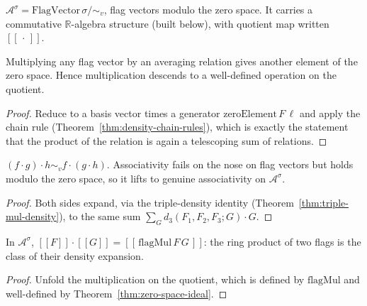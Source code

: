 \begin{definition}
  \label{def:flag-algebra}
  \leanok
  $\mathcal{A}^\sigma = \mathrm{FlagVector}\,\sigma / {\sim_v}$, flag vectors
  modulo the zero space. It carries a commutative $\mathbb{R}$-algebra structure
  (built below), with quotient map written $[\![\,\cdot\,]\!]$.
\end{definition}

\begin{theorem}
  \label{thm:zero-space-ideal}
  \leanok
  Multiplying any flag vector by an averaging relation gives another element of
  the zero space. Hence multiplication descends to a well-defined operation on
  the quotient.
\end{theorem}
\begin{proof}\leanok
  Reduce to a basis vector times a generator $\mathrm{zeroElement}\,F\,\ell$ and
  apply the chain rule (Theorem~\ref{thm:density-chain-rules}), which is exactly
  the statement that the product of the relation is again a telescoping sum of
  relations.
\end{proof}

\begin{theorem}
  \label{thm:mul-assoc}
  \leanok
  $(f\cdot g)\cdot h \sim_v f\cdot(g\cdot h)$. Associativity fails on the nose on
  flag vectors but holds modulo the zero space, so it lifts to genuine
  associativity on $\mathcal{A}^\sigma$.
\end{theorem}
\begin{proof}\leanok
  Both sides expand, via the triple-density identity
  (Theorem~\ref{thm:triple-mul-density}), to the same sum
  $\sum_{G} d_3(F_1,F_2,F_3;G)\cdot G$.
\end{proof}

\begin{theorem}
  \label{thm:quot-mul-density}
  \leanok
  In $\mathcal{A}^\sigma$, $[\![F]\!]\cdot[\![G]\!] = [\![\,\mathrm{flagMul}\,F\,G\,]\!]$:
  the ring product of two flags is the class of their density expansion.
\end{theorem}
\begin{proof}\leanok
  Unfold the multiplication on the quotient, which is defined by
  $\mathrm{flagMul}$ and well-defined by Theorem~\ref{thm:zero-space-ideal}.
\end{proof}


